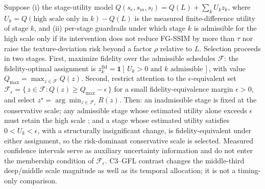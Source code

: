 \documentclass[times,twocolumn,final]{elsarticle}
\providecommand{\DIFadd}[1]{{\protect\color{blue} \sf #1}} %
\providecommand{\DIFdel}[1]{{\protect\color{red} \scriptsize #1}} %
\providecommand{\DIFaddbegin}{} %
\providecommand{\DIFaddend}{} %
\providecommand{\DIFdelend}{} %
\begin{document}
\DIFdel{Suppose (i) the stage-utility model $Q(s_e,s_m,s_l)=Q(L)+\sum_{k}U_k z_k$, where $U_k=Q(\text{high scale only in }k)-Q(L)$ is the measured finite-difference utility of stage $k$, and (ii) per-stage guardrails under which stage $k$ is admissible for the high scale only if its intervention does not reduce FG-SSIM by more than $\tau$ nor raise the texture-deviation risk beyond a factor $\rho$ relative to $L$. Selection proceeds in two stages. First, maximize fidelity over the admissible schedules $\mathcal{F}$: the fidelity-optimal assignment is $z_k^{\mathrm{fid}}=\mathbf{1}[\,U_k>0 \text{ and } k \text{ admissible}\,]$, with value $Q_{\max}=\max_{z\in\mathcal{F}}Q(z)$. Second, restrict attention to the $\epsilon$-equivalent set $\mathcal{F}_\epsilon=\{\,z\in\mathcal{F}: Q(z)\ge Q_{\max}-\epsilon\,\}$ for a small fidelity-equivalence margin $\epsilon>0$, and select $z^{\star}=\arg\min_{z\in\mathcal{F}_\epsilon}R(z)$. Then: an inadmissible stage is fixed at the conservative scale; any admissible stage whose estimated utility alone exceeds $\epsilon$ must retain the high scale ; and a stage whose estimated utility satisfies $0<U_k<\epsilon$, with a structurally insignificant change, is fidelity-equivalent under either assignment, so the risk-dominant conservative scale is selected. Measured confidence intervals serve as auxiliary uncertainty information and do not enter the membership condition of $\mathcal{F}_\epsilon$.
}%
\DIFdelend \DIFaddbegin \DIFadd{C3--GFL contrast changes the middle-third deep/middle scale magnitude as well as its temporal allocation; it is not a timing-only comparison.
}\DIFaddend
\end{document}
